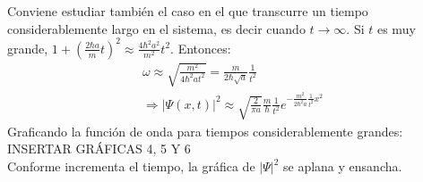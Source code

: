 Conviene estudiar también el caso en el que transcurre un tiempo considerablemente largo en el sistema, es decir cuando
$t\rightarrow\infty$. Si $t$ es muy grande, $1+\left (\frac{2\hbar a}{m}t \right )^2 \approx \frac{4\hbar^2a^2}{m^2}t^2$.
Entonces:
\begin{gather*}
    \omega \approx \sqrt{\frac{m^2}{4\hbar^2at^2}} = \frac{m}{2\hbar\sqrt{a}} \frac{1}{t^2} \\
    \Rightarrow \lvert\Psi(x,t)\rvert^2 \approx \sqrt{\frac{2}{\pi a}} \frac{m}{\hbar} \frac{1}{t^2} e^{-\frac{m^2}{2\hbar^2a} \frac{1}{t^2} x^2}
\end{gather*}
Graficando la función de onda para tiempos considerablemente grandes:\\

INSERTAR GRÁFICAS 4, 5 Y 6 \\

Conforme incrementa el tiempo, la gráfica de $\lvert\Psi\rvert^2$ se aplana y ensancha.